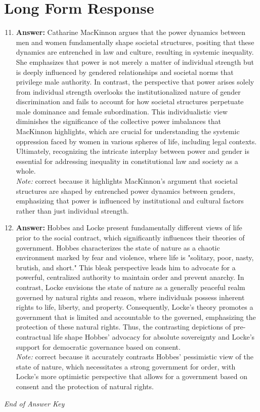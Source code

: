 \documentclass[12pt]{article}
\begin{document}
\section*{Long Form Response}
\begin{enumerate}[label=\arabic*.]
\setcounter{enumi}{10}
\item \textbf{Answer:} Catharine MacKinnon argues that the power dynamics between men and women fundamentally shape societal structures, positing that these dynamics are entrenched in law and culture, resulting in systemic inequality. She emphasizes that power is not merely a matter of individual strength but is deeply influenced by gendered relationships and societal norms that privilege male authority. In contrast, the perspective that power arises solely from individual strength overlooks the institutionalized nature of gender discrimination and fails to account for how societal structures perpetuate male dominance and female subordination. This individualistic view diminishes the significance of the collective power imbalances that MacKinnon highlights, which are crucial for understanding the systemic oppression faced by women in various spheres of life, including legal contexts. Ultimately, recognizing the intricate interplay between power and gender is essential for addressing inequality in constitutional law and society as a whole.
\\ \textit{Note:} correct because it highlights MacKinnon's argument that societal structures are shaped by entrenched power dynamics between genders, emphasizing that power is influenced by institutional and cultural factors rather than just individual strength.
\item \textbf{Answer:} Hobbes and Locke present fundamentally different views of life prior to the social contract, which significantly influences their theories of government. Hobbes characterizes the state of nature as a chaotic environment marked by fear and violence, where life is "solitary, poor, nasty, brutish, and short." This bleak perspective leads him to advocate for a powerful, centralized authority to maintain order and prevent anarchy. In contrast, Locke envisions the state of nature as a generally peaceful realm governed by natural rights and reason, where individuals possess inherent rights to life, liberty, and property. Consequently, Locke's theory promotes a government that is limited and accountable to the governed, emphasizing the protection of these natural rights. Thus, the contrasting depictions of pre-contractual life shape Hobbes' advocacy for absolute sovereignty and Locke's support for democratic governance based on consent.
\\ \textit{Note:} correct because it accurately contrasts Hobbes' pessimistic view of the state of nature, which necessitates a strong government for order, with Locke's more optimistic perspective that allows for a government based on consent and the protection of natural rights.
\end{enumerate}

\vfill
\noindent\textit{End of Answer Key}
\end{document}

